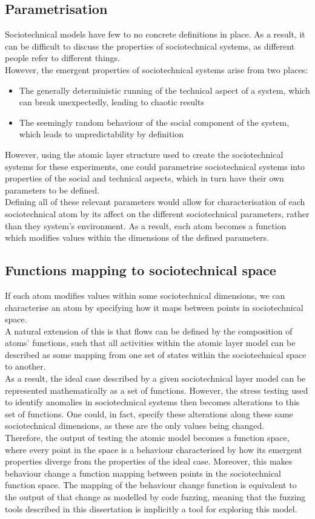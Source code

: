 \documentclass[a4paper]{l4proj}
\begin{document}
\begin{itemize}
\subsection{Parametrisation}
Sociotechnical models have few to no concrete definitions in place. As a result, it can be difficult to discuss the properties of sociotechnical systems, as different people refer to different things. \\
However, the emergent properties of sociotechnical systems arise from two places:
\begin{itemize}
\item The generally deterministic running of the technical aspect of a system, which can break unexpectedly, leading to chaotic results
\item The seemingly random behaviour of the social component of the system, which leads to unpredictability by definition
\end{itemize}
However, using the atomic layer structure used to create the sociotechnical systems for these experiments, one could parametrise sociotechnical systems into properties of the social and technical aspects, which in turn have their own parameters to be defined.\\
Defining all of these relevant parameters would allow for characterisation of each sociotechnical atom by its affect on the different sociotechnical parameters, rather than they system's environment. As a result, each atom becomes a function which modifies values within the dimensions of the defined parameters. 

\subsection{Functions mapping to sociotechnical space}
If each atom modifies values within some sociotechnical dimensions, we can characterise an atom by specifying how it maps between points in sociotechnical space.\\
A natural extension of this is that flows can be defined by the composition of atoms' functions, such that all activities within the atomic layer model can be described as some mapping from one set of states within the sociotechnical space to another.\\
As a result, the ideal case described by a given sociotechnical layer model can be represented mathematically as a set of functions. However, the stress testing used to identify anomalies in sociotechnical systems then becomes alterations to this set of functions. One could, in fact, specify these alterations along these same sociotechnical dimensions, as these are the only values being changed. \\
Therefore, the output of testing the atomic model becomes a function space, where every point in the space is a behaviour characterised by how its emergent properties diverge from the properties of the ideal case. Moreover, this makes behaviour change a function mapping between points in the sociotechnical function space. The mapping of the behaviour change function is equivalent to the output of that change as modelled by code fuzzing, meaning that the fuzzing tools described in this dissertation is implicitly a tool for exploring this model.


\end{itemize}
\end{document}
